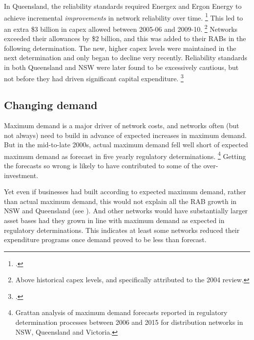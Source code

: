 \documentclass[FrontPage]{grattan}
\begin{document}
In Queensland, the reliability standards required Energex and Ergon Energy to achieve incremental \emph{improvements} in network reliability over time.%
\footcite{QCA2013ReliabilityStandardsReview}
This led to an extra \$3 billion in capex allowed between 2005-06 and 2009-10.%
\footnote{Above historical capex levels, and specifically attributed to the 2004 review.}
Networks exceeded their allowances by \$2 billion, and this was added to their RABs in the following determination. The new, higher capex levels were maintained in the next determination and only began to decline very recently.
Reliability standards in both Queensland and NSW were later found to be excessively cautious, but not before they had driven significant capital expenditure.%
\footcites{PC2013ElectricityInquiry}{Bellas2014IRPonnetworkcosts}


\subsection{Changing demand}\label{subsec:changing-demand}
Maximum demand is a major driver of network costs, and networks often (but not always) need to build in advance of expected increases in maximum demand. But in the mid-to-late 2000s, actual maximum demand fell well short of expected maximum demand as forecast in five yearly regulatory determinations.%
\footnote{Grattan analysis of maximum demand forecasts reported in regulatory determination processes between 2006 and 2015 for distribution networks in NSW, Queensland and Victoria.}
Getting the forecasts so wrong is likely to have contributed to some of the over-investment. 

Yet even if businesses had built according to expected maximum demand, rather than actual maximum demand, this would not explain all the RAB growth in NSW and Queensland (see ). And other networks would have substantially larger asset bases had they grown in line with maximum demand as expected in regulatory determinations. This indicates at least some networks reduced their expenditure programs once demand proved to be less than forecast.
\end{document}
